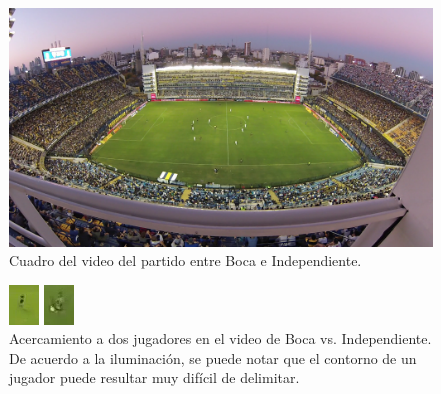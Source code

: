 \begin{figure}[H]
  \centering
  \includegraphics[width=\linewidth]{./images/boca-figura.png}
  \caption{Cuadro del video del partido entre Boca e Independiente.}
  \label{fig:boca-figura}
\end{figure}
\begin{figure}[H]
    \centering
    \begin{minipage}[t]{.5\textwidth}
        \centering
        \includegraphics[width=.4\linewidth]{./images/boca-dificil1.png}
    \end{minipage}%
    \begin{minipage}[t]{.5\textwidth}
        \centering
        \includegraphics[width=.4\linewidth]{./images/boca-dificil2.png}
    \end{minipage}
    \caption{Acercamiento a dos jugadores en el video de Boca vs.
             Independiente. De acuerdo a la iluminación, se puede notar que el
             contorno de un jugador puede resultar muy difícil de delimitar.
        \label{fig:boca-dificil-1}}

\end{figure}
